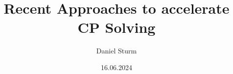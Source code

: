 \def\languages{main=german,english}


\title{Recent Approaches to accelerate CP Solving}

\author{Daniel Sturm}






\date{16.06.2024}


